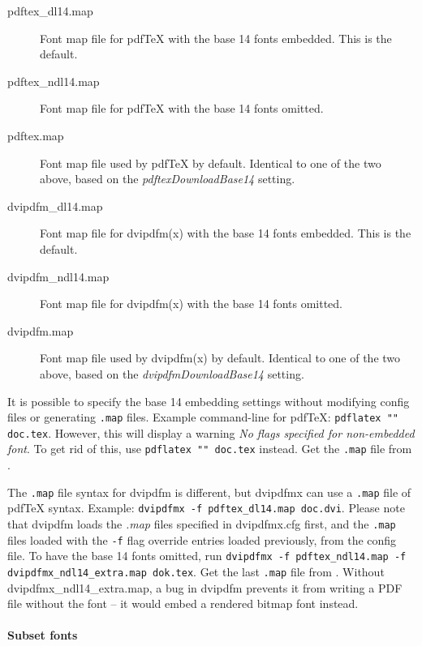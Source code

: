 \documentclass{ltugproc}
\def\cmd{\textsf}
\def\pkg{\textsf}
\begin{document}
\begin{description}

\item[pdftex\_dl14.map] Font map file for pdf\TeX{} with the base 14 fonts
  embedded. This is the default.
\item[pdftex\_ndl14.map] Font map file for pdf\TeX{} with the base 14 fonts
  omitted.
\item[pdftex.map] Font map file used by pdf\TeX{} by default.
Identical to one of the two above, based on the
\emph{pdftexDownloadBase14} setting.
\item[dvipdfm\_dl14.map] Font map file for \cmd{dvipdfm(x)} with the base 14
  fonts embedded. This is the default.
\item[dvipdfm\_ndl14.map] Font map file for \cmd{dvipdfm(x)} with the base 14
  fonts omitted.
\item[dvipdfm.map] Font map file used by \cmd{dvipdfm(x)} by default.
Identical to one of the two above, based on the
\emph{dvipdfmDownloadBase14} setting.

\end{description}

It is possible to specify the base 14 embedding settings without modifying
config files or generating \texttt{.map} files. Example command-line for
pdf\TeX{}: \texttt{pdflatex "\string{}\string"
doc.tex}.
However, this will display a warning \emph{No flags specified for
non-embedded font}. To get rid of this, use
\texttt{pdflatex "\string{}\string"
doc.tex}
instead. Get the \texttt{.map} file from \cite{pdfsizeopt-extra}.

The \texttt{.map} file syntax for \cmd{dvipdfm} is different, but
\cmd{dvipdfmx} can use a \texttt{.map} file of pdf\TeX{} syntax. Example:
\texttt{dvipdfmx -f pdftex\_dl14.map doc.dvi}. Please note that
\cmd{dvipdfm} loads the \emph{.map} files specified in \pkg{dvipdfmx.cfg}
first, and the \texttt{.map} files loaded with the \texttt{-f} flag override
entries loaded previously, from the config file. To have the base 14 fonts
omitted, run \texttt{dvipdfmx -f pdftex\_ndl14.map -f
dvipdfmx\_ndl14\_extra.map dok.tex}. Get the last \texttt{.map} file from
\cite{pdfsizeopt-extra}. Without \pkg{dvipdfmx\_ndl14\_extra.map}, a bug in
\cmd{dvipdfm} prevents it from writing a PDF file without the font -- it
would embed a rendered bitmap font instead.

\paragraph{Subset fonts}
\end{document}
